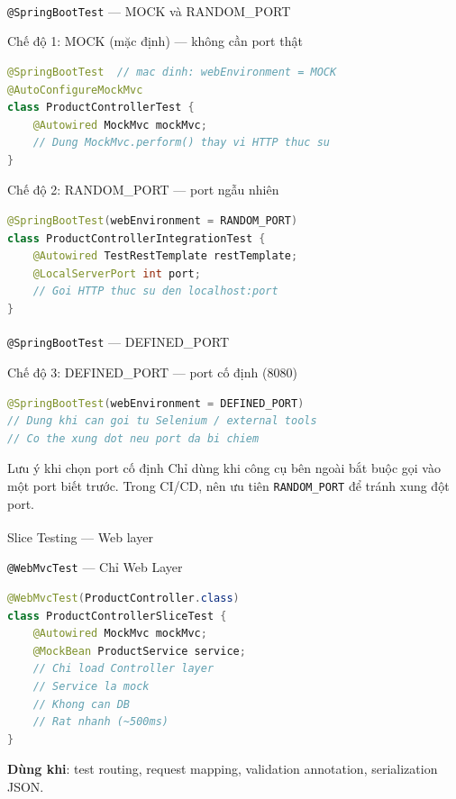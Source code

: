 \documentclass[aspectratio=169,10pt]{beamer}
\newcommand{\sref}[1]{\textsuperscript{\scriptsize\cite{#1}}}
\begin{document}
\begin{frame}[fragile]{\texttt{@SpringBootTest} --- MOCK và RANDOM\_PORT\sref{spring-boot-testing}}
  \begin{block}{Chế độ 1: MOCK (mặc định) --- không cần port thật}
\begin{lstlisting}[language=Java,style=nonumber]
@SpringBootTest  // mac dinh: webEnvironment = MOCK
@AutoConfigureMockMvc
class ProductControllerTest {
    @Autowired MockMvc mockMvc;
    // Dung MockMvc.perform() thay vi HTTP thuc su
}
\end{lstlisting}
  \end{block}

  \begin{block}{Chế độ 2: RANDOM\_PORT --- port ngẫu nhiên}
\begin{lstlisting}[language=Java,style=nonumber]
@SpringBootTest(webEnvironment = RANDOM_PORT)
class ProductControllerIntegrationTest {
    @Autowired TestRestTemplate restTemplate;
    @LocalServerPort int port;
    // Goi HTTP thuc su den localhost:port
}
\end{lstlisting}
  \end{block}

\end{frame}

\begin{frame}[fragile]{\texttt{@SpringBootTest} --- DEFINED\_PORT\sref{spring-boot-testing}}
  \begin{block}{Chế độ 3: DEFINED\_PORT --- port cố định (8080)}
\begin{lstlisting}[language=Java,style=nonumber]
@SpringBootTest(webEnvironment = DEFINED_PORT)
// Dung khi can goi tu Selenium / external tools
// Co the xung dot neu port da bi chiem
\end{lstlisting}
  \end{block}

  \begin{alertblock}{Lưu ý khi chọn port cố định}
    Chỉ dùng khi công cụ bên ngoài bắt buộc gọi vào một port biết trước.
    Trong CI/CD, nên ưu tiên \texttt{RANDOM\_PORT} để tránh xung đột port.
  \end{alertblock}
\end{frame}

\begin{frame}[fragile]{Slice Testing --- Web layer\sref{spring-boot-testing}}
    \begin{block}{\texttt{@WebMvcTest} --- Chỉ Web Layer}
\begin{lstlisting}[language=Java,style=small]
@WebMvcTest(ProductController.class)
class ProductControllerSliceTest {
    @Autowired MockMvc mockMvc;
    @MockBean ProductService service;
    // Chi load Controller layer
    // Service la mock
    // Khong can DB
    // Rat nhanh (~500ms)
}
\end{lstlisting}
      \textbf{Dùng khi}: test routing, request mapping,
      validation annotation, serialization JSON.
    \end{block}
\end{frame}
\end{document}
